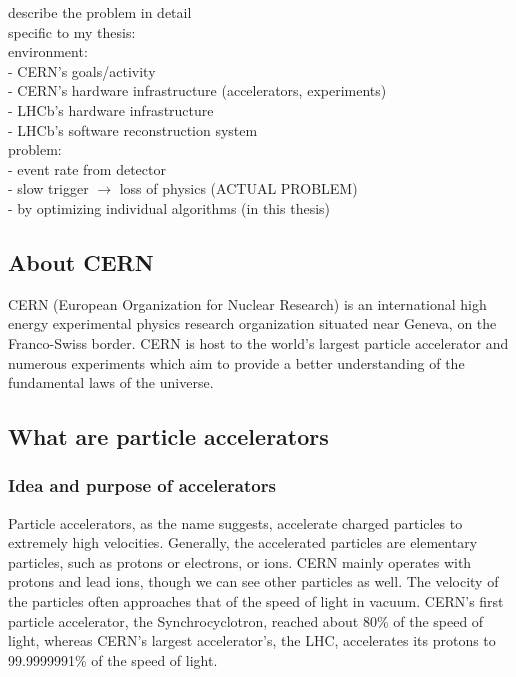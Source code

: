 \documentclass[12pt]{article}
\begin{document}
\color{red}
describe the problem in detail \\
specific to my thesis: \\
environment: \\
- CERN's goals/activity \\
- CERN's hardware infrastructure (accelerators, experiments) \\
- LHCb's hardware infrastructure \\
- LHCb's software reconstruction system \\
problem: \\
- event rate from detector \\
- slow trigger $\rightarrow$ loss of physics (ACTUAL PROBLEM) \\
- by optimizing individual algorithms (in this thesis) \\
\color{black}
\vspace{1.5pc}


\subsection{About CERN}\label{sec_about_cern}

CERN (European Organization for Nuclear Research) is an international high energy experimental physics research organization situated near Geneva, on the Franco-Swiss border. CERN is host to the world's largest particle accelerator and numerous experiments which aim to provide a better understanding of the fundamental laws of the universe.
\cite{cern_about}


\subsection{What are particle accelerators}\label{sec_part_accel_intro}

\subsubsection{Idea and purpose of accelerators}\label{sec_part_accel_idea}
Particle accelerators, as the name suggests, accelerate charged particles to extremely high velocities. Generally, the accelerated particles are elementary particles, such as protons or electrons, or ions. CERN mainly operates with protons and lead ions, though we can see other particles as well. The velocity of the particles often approaches that of the speed of light in vacuum. CERN's first particle accelerator, the Synchrocyclotron, reached about 80\% of the speed of light, whereas CERN's largest accelerator's, the LHC, accelerates its protons to 99.9999991\% \cite{lhc_facts_and_figures} of the speed of light.
\end{document}
